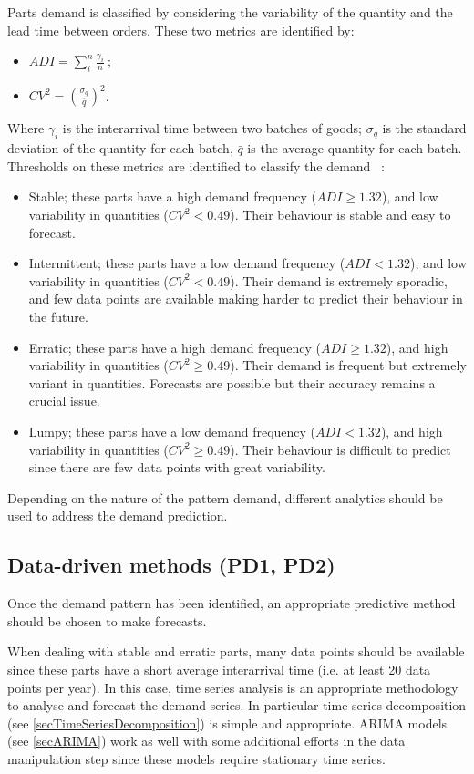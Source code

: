 Parts demand is classified by considering the variability of the quantity and the lead time between orders. These two metrics are identified by:
\begin{itemize}
    \item $ADI=\sum_{i}^{n}\frac{\gamma_i}{n}\ $;
    \item $CV^2=\left(\frac{\sigma_q}{\bar{q}}\right)^2$.
\end{itemize}

Where $\gamma_i$ is the interarrival time between two batches of goods; $\sigma_q$ is the standard deviation of the quantity for each batch, $\bar{q}$ is the average quantity for each batch. Thresholds on these metrics are identified to classify the demand ~\cite{Syntetos2005}:

\begin{itemize}
    \item Stable; these parts have a high demand frequency ($ADI\geq1.32$), and low variability in quantities ($CV^2<0.49$). Their behaviour is stable and easy to forecast.
	\item Intermittent; these parts have a low demand frequency ($ADI<1.32$), and low variability in quantities ($CV^2<0.49$). Their demand is extremely sporadic, and few data points are available making harder to predict their behaviour in the future.
	\item Erratic; these parts have a high demand frequency ($ADI\geq1.32$), and high variability in quantities ($CV^2\geq0.49$). Their demand is frequent but extremely variant in quantities. Forecasts are possible but their accuracy remains a crucial issue.
	\item Lumpy; these parts have a low demand frequency ($ADI<1.32$), and high variability in quantities ($CV^2\geq0.49$). Their behaviour is difficult to predict since there are few data points with great variability. 
\end{itemize}

Depending on the nature of the pattern demand, different analytics should be used to address the demand prediction. 

\subsection{Data-driven methods (PD1, PD2)}
Once the demand pattern has been identified, an appropriate predictive method should be chosen to make forecasts.\par

When dealing with stable and erratic parts, many data points should be available since these parts have a short average interarrival time (i.e. at least 20 data points per year). In this case, time series analysis is an appropriate methodology to analyse and forecast the demand series. In particular time series decomposition (see \ref{secTimeSeriesDecomposition}) is simple and appropriate. ARIMA models (see \ref{secARIMA}) work as well with some additional efforts in the data manipulation step since these models require stationary time series.\par

